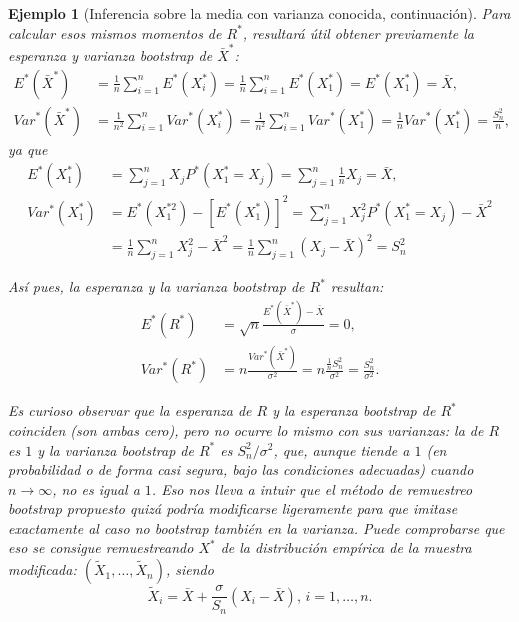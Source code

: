 \documentclass[
]{book}
\theoremstyle{break}
\newtheorem{example}{Ejemplo}[chapter]
\theoremstyle{nonumberplain}
\begin{document}
\begin{example}[Inferencia sobre la media con varianza conocida, continuación]
Para calcular esos mismos momentos de \(R^{\ast}\), resultará útil
obtener previamente la esperanza y varianza bootstrap de
\(\bar{X}^{\ast}\):
\[\begin{aligned}
E^{\ast}\left( \bar{X}^{\ast} \right) &= \frac{1}{n}
\sum_{i=1}^{n}E^{\ast}\left( X_i^{\ast} \right) =\frac{1}{n}
\sum_{i=1}^{n}E^{\ast}\left( X_1^{\ast} \right) =E^{\ast}\left(
X_1^{\ast} \right) =\bar{X}, \\
Var^{\ast}\left( \bar{X}^{\ast} \right) &= \frac{1}{n^2}
\sum_{i=1}^{n}Var^{\ast}\left( X_i^{\ast} \right) =\frac{1}{n^2}
\sum_{i=1}^{n}Var^{\ast}\left( X_1^{\ast} \right) =\frac{1}{n}Var^{\ast
}\left( X_1^{\ast} \right) =\frac{S_n^2}{n},
\end{aligned}\]
ya que
\[\begin{aligned}
E^{\ast}\left( X_1^{\ast} \right) &= \sum_{j=1}^{n}X_jP^{\ast}\left(
X_1^{\ast}=X_j \right) =\sum_{j=1}^{n}\frac{1}{n}X_j=\bar{X}, \\
Var^{\ast}\left( X_1^{\ast} \right) &= E^{\ast}\left( X_1^{\ast
2} \right) -\left[ E^{\ast}\left( X_1^{\ast} \right) \right]
^2=\sum_{j=1}^{n}X_j^2P^{\ast}\left( X_1^{\ast}=X_j \right) -\bar{X}
^2 \\
&= \frac{1}{n}\sum_{j=1}^{n}X_j^2-\bar{X}^2=\frac{1}{n}
\sum_{j=1}^{n}\left( X_j-\bar{X} \right)^2=S_n^2
\end{aligned}\]

Así pues, la esperanza y la varianza bootstrap de \(R^{\ast}\)
resultan:
\[\begin{aligned}
E^{\ast}\left( R^{\ast} \right) &= \sqrt{n}\frac{E^{\ast}\left( \bar{X}^{\ast} \right) -\bar{X}}{\sigma }=0, \\
Var^{\ast}\left( R^{\ast} \right) &= n\frac{Var^{\ast}\left( \bar{X}^{\ast} \right)}{\sigma^2}=n\frac{\frac{1}{n}S_n^2}{\sigma^2}=
\frac{S_n^2}{\sigma^2}.
\end{aligned}\]

Es curioso observar que la esperanza de \(R\) y la esperanza bootstrap de
\(R^{\ast}\) coinciden (son ambas cero), pero no ocurre lo mismo con sus
varianzas: la de \(R\) es \(1\) y la varianza bootstrap de \(R^{\ast}\) es
\(S_n^2/\sigma^2\), que, aunque tiende a \(1\) (en probabilidad o de
forma casi segura, bajo las condiciones adecuadas) cuando \(n\rightarrow
\infty\), no es igual a \(1\). Eso nos lleva a intuir que el método de
remuestreo bootstrap propuesto quizá podría modificarse ligeramente para
que imitase exactamente al caso no bootstrap también en la varianza.
Puede comprobarse que eso se consigue remuestreando \(X^{\ast}\) de la
distribución empírica de la muestra modificada:
\(\left( \tilde{X}_1,\ldots ,\tilde{X}_n \right)\), siendo
\[\tilde{X}_i=\bar{X}+\frac{\sigma }{S_n}\left( X_i-\bar{X}
 \right) \text{, }i=1,\ldots ,n.\]


\end{example}
\end{document}
